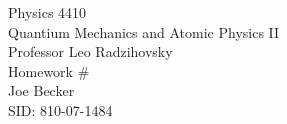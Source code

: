 \begin{titlepage}
\setlength{\topmargin}{1.5in}
\begin{center}
\Huge{Physics 4410} \\
\LARGE{Quantium Mechanics and Atomic Physics II} \\
\Large{Professor Leo Radzihovsky} \\[1cm]

\huge{Homework \#\HWnum}\\[0.5cm]

\large{Joe Becker} \\
\large{SID: 810-07-1484} \\
\large{\due} 

\end{center}

\end{titlepage}

